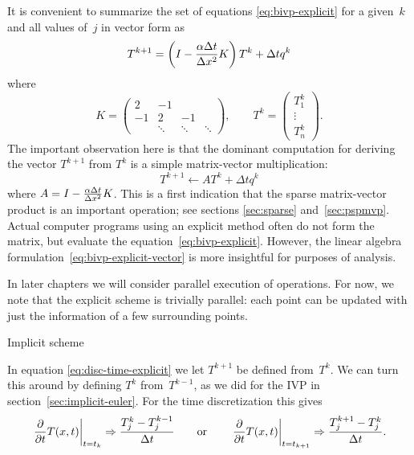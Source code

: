 It is convenient to summarize the set of equations
\eqref{eq:bivp-explicit} for a given~$k$ and all values of~$j$
in vector form as
\begin{equation}
  \label{eq:bivp-explicit-vector}  
   T^{k+1}=\left(I-\frac{\alpha\Delta t}{\Delta x^2} K\right)
   T^k+\Delta t q^k 
\end{equation}
where
\[
  K=
  \begin{pmatrix}
    2&-1\\ -1&2&-1\\ &\ddots&\ddots&\ddots
  \end{pmatrix},\qquad
  T^k=
  \begin{pmatrix}
    T^k_1\\ \vdots \\ T^k_n
  \end{pmatrix}.
\]
The important observation here is that the dominant computation for
deriving the vector $T^{k+1}$ 
from $ T^k$ is a simple matrix-vector multiplication:
\[ T^{k+1}\leftarrow AT^k+\Delta tq^k \]
where $A=I-\frac{\alpha\Delta t}{\Delta x^2} K$. This is a first indication that the sparse
matrix-vector product is an important operation; see sections
\ref{sec:sparse} and~\ref{sec:pspmvp}.
Actual
computer programs using an explicit method often do not form the
matrix, but evaluate the equation~\eqref{eq:bivp-explicit}. However,
the linear algebra formulation~\eqref{eq:bivp-explicit-vector}
is more insightful for purposes of analysis.

In later chapters we will consider parallel execution of operations.
For now, we note that the explicit scheme is trivially parallel: 
each point can be updated with just the information of a few surrounding
points.

 {Implicit scheme}

In equation \eqref{eq:disc-time-explicit} we let $T^{k+1}$ be defined
from~$T^k$. We can turn this around by defining $T^k$ from~$T^{k-1}$,
as we did for the \ac{IVP} in section~\ref{sec:implicit-euler}. For
the time discretization this gives
\begin{equation}
  \left.\frac\partial{\partial t}T(x,t)\right|_{t=t_k}
  \Rightarrow
  \frac{T_j^k-T_j^{k-1}}{\Delta t}
  \qquad\hbox{or}\qquad
  \left.\frac\partial{\partial t}T(x,t)\right|_{t=t_{k+1}}
  \Rightarrow
  \frac{T_j^{k+1}-T_j^k}{\Delta t}.
  \label{eq:heat-time-explicit}
\end{equation}

